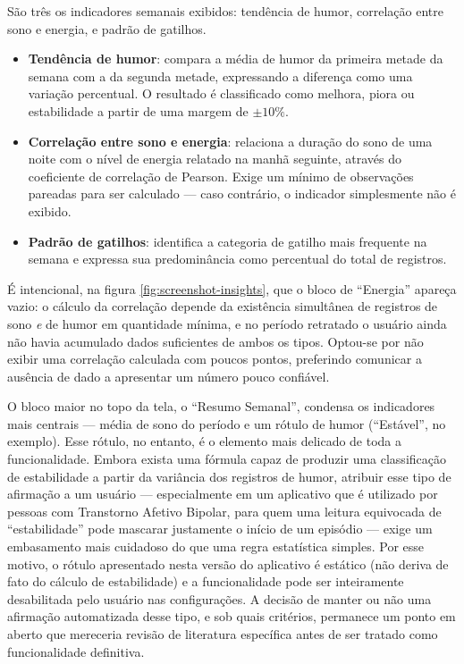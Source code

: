 
São três os indicadores semanais exibidos: tendência de humor, correlação
entre sono e energia, e padrão de gatilhos.

\begin{itemize}
    \item \textbf{Tendência de humor}: compara a média de humor da
    primeira metade da semana com a da segunda metade, expressando a
    diferença como uma variação percentual. O resultado é classificado
    como melhora, piora ou estabilidade a partir de uma margem de $\pm10\%$.

    \item \textbf{Correlação entre sono e energia}: relaciona a duração
    do sono de uma noite com o nível de energia relatado na manhã
    seguinte, através do coeficiente de correlação de Pearson. Exige um
    mínimo de observações pareadas para ser calculado --- caso contrário,
    o indicador simplesmente não é exibido.

    \item \textbf{Padrão de gatilhos}: identifica a categoria de gatilho
    mais frequente na semana e expressa sua predominância como percentual
    do total de registros.
\end{itemize}

É intencional, na figura \ref{fig:screenshot-insights}, que o bloco de
``Energia'' apareça vazio: o cálculo da correlação depende da existência
simultânea de registros de sono \emph{e} de humor em quantidade mínima,
e no período retratado o usuário ainda não havia acumulado dados
suficientes de ambos os tipos. Optou-se por não exibir uma correlação
calculada com poucos pontos, preferindo comunicar a ausência de dado a
apresentar um número pouco confiável.

O bloco maior no topo da tela, o ``Resumo Semanal'', condensa os
indicadores mais centrais --- média de sono do período e um rótulo de
humor (``Estável'', no exemplo). Esse rótulo, no entanto, é o elemento
mais delicado de toda a funcionalidade. Embora exista uma fórmula capaz
de produzir uma classificação de estabilidade a partir da variância dos
registros de humor, atribuir esse tipo de afirmação a um usuário ---
especialmente em um aplicativo que é utilizado por pessoas com
Transtorno Afetivo Bipolar, para quem uma leitura equivocada de
``estabilidade'' pode mascarar justamente o início de um episódio ---
exige um embasamento mais cuidadoso do que uma regra estatística
simples. Por esse motivo, o rótulo apresentado nesta versão do
aplicativo é estático (não deriva de fato do cálculo de estabilidade) e
a funcionalidade pode ser inteiramente desabilitada pelo usuário nas
configurações. A decisão de manter ou não uma afirmação automatizada
desse tipo, e sob quais critérios, permanece um ponto em aberto que
mereceria revisão de literatura específica antes de ser tratado como
funcionalidade definitiva.

